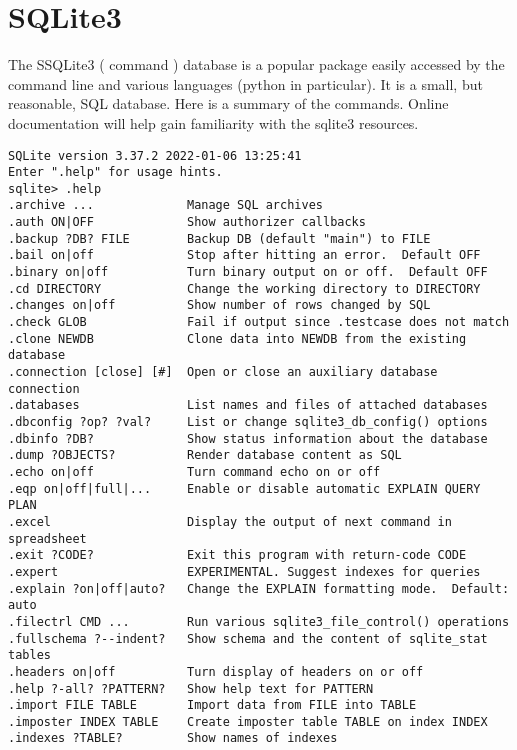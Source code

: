 \section{SQLite3}

The SSQLite3 ( command  )  database is a popular
package easily accessed by the command line and various languages (python
in particular). It is a small, but reasonable, SQL database. Here is a summary
of the commands. Online documentation will help gain familiarity with the
sqlite3 resources.

\begingroup \fontsize{10pt}{10pt}
\selectfont
\begin{verbatim} 
SQLite version 3.37.2 2022-01-06 13:25:41
Enter ".help" for usage hints.
sqlite> .help
.archive ...             Manage SQL archives
.auth ON|OFF             Show authorizer callbacks
.backup ?DB? FILE        Backup DB (default "main") to FILE
.bail on|off             Stop after hitting an error.  Default OFF
.binary on|off           Turn binary output on or off.  Default OFF
.cd DIRECTORY            Change the working directory to DIRECTORY
.changes on|off          Show number of rows changed by SQL
.check GLOB              Fail if output since .testcase does not match
.clone NEWDB             Clone data into NEWDB from the existing database
.connection [close] [#]  Open or close an auxiliary database connection
.databases               List names and files of attached databases
.dbconfig ?op? ?val?     List or change sqlite3_db_config() options
.dbinfo ?DB?             Show status information about the database
.dump ?OBJECTS?          Render database content as SQL
.echo on|off             Turn command echo on or off
.eqp on|off|full|...     Enable or disable automatic EXPLAIN QUERY PLAN
.excel                   Display the output of next command in spreadsheet
.exit ?CODE?             Exit this program with return-code CODE
.expert                  EXPERIMENTAL. Suggest indexes for queries
.explain ?on|off|auto?   Change the EXPLAIN formatting mode.  Default: auto
.filectrl CMD ...        Run various sqlite3_file_control() operations
.fullschema ?--indent?   Show schema and the content of sqlite_stat tables
.headers on|off          Turn display of headers on or off
.help ?-all? ?PATTERN?   Show help text for PATTERN
.import FILE TABLE       Import data from FILE into TABLE
.imposter INDEX TABLE    Create imposter table TABLE on index INDEX
.indexes ?TABLE?         Show names of indexes

\end{verbatim}
